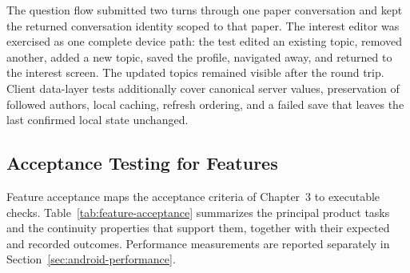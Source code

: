 The question flow submitted two turns through one paper conversation and kept
the returned conversation identity scoped to that paper. The interest editor
was exercised as one complete device path: the test edited an existing topic,
removed another, added a new topic, saved the profile, navigated away, and
returned to the interest screen. The updated topics remained visible after the
round trip. Client data-layer tests additionally cover canonical server values,
preservation of followed authors, local caching, refresh ordering, and a failed
save that leaves the last confirmed local state unchanged.

\subsection{Acceptance Testing for Features}

Feature acceptance maps the acceptance criteria of Chapter~3 to executable checks.
Table~\ref{tab:feature-acceptance} summarizes the principal product tasks and
the continuity properties that support them, together with their expected and
recorded outcomes. Performance measurements are reported separately in
Section~\ref{sec:android-performance}.

